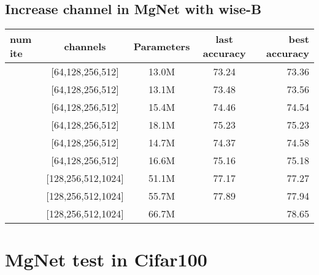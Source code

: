 \subsection{Increase channel in MgNet with wise-B}
\begin{table}[H]
	\begin{tabular}{| l | c | c | c | r |}
		\hline
		num ite    &      channels      &    Parameters   &   last accuracy   &  best accuracy  \\
		\hline
		[2,2,2,2]   &  [64,128,256,512]  &    13.0M         &   73.24           &  73.36          \\
		\hline
		[4,2,2,2]   &  [64,128,256,512]  &    13.1M         &   73.48           &  73.56          \\
		\hline
		[3,3,5,2]   &  [64,128,256,512]  &    15.4M         &   74.46           &  74.54          \\
		\hline
		[3,4,6,3]   &  [64,128,256,512]  &    18.1M         &   75.23           &  75.23          \\
		\hline
		[2,2,4,2]   &  [64,128,256,512]  &    14.7M         &   74.37           &  74.58          \\
		\hline
		[2,2,8,2]   &  [64,128,256,512]  &    16.6M         &   75.16           &  75.18          \\
		\hline
		\hline
		[2,2,2,2]   &  [128,256,512,1024]    &   51.1M     &    77.17          & 77.27     \\
		\hline
		[2,2,4,2]   &  [128,256,512,1024]    &   55.7M     &    77.89          & 77.94     \\
		\hline
		[3,4,6,3]   &  [128,256,512,1024]    &   66.7M     &                   & 78.65     \\
		\hline
	\end{tabular}
\end{table}

\newpage
\section{MgNet test in Cifar100}

